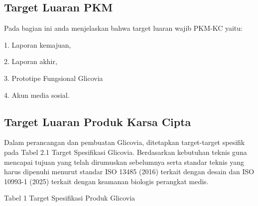 \documentclass[a4paper,12pt]{article}
\begin{document}
\subsection{Target Luaran PKM}

  Pada bagian ini anda menjelaskan bahwa target luaran wajib PKM-KC yaitu:

1.  Laporan kemajuan,

2.  Laporan akhir,

3.  Prototipe Fungsional Glicovia

4.  Akun media sosial.

\subsection{Target Luaran Produk Karsa Cipta}

Dalam perancangan dan pembuatan Glicovia, ditetapkan target-target spesifik pada Tabel 2.1 Target Spesifikasi Glicovia. Berdasarkan kebutuhan teknis guna mencapai tujuan yang telah dirumuskan sebelumnya serta standar teknis yang harus dipenuhi menurut standar ISO 13485 (2016) terkait dengan desain dan ISO 10993-1 (2025) terkait dengan keamanan biologis perangkat medis.

Tabel 1 Target Spesifikasi Produk Glicovia
\end{document}
